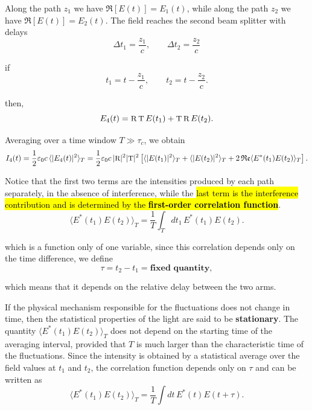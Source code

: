 Along the path $z_1$ we have $\Re[E(t)] = E_1(t)$, while along the path $z_2$ we have $\Re[E(t)] = E_2(t)$. The field reaches the second beam splitter with delays
\begin{equation}\label{eqn:6-delays}
    \Delta t_1 = \frac{z_1}{c}, \qquad \Delta t_2 = \frac{z_2}{c}
\end{equation}

if 
\[
t_1 = t - \frac{z_1}{c}, \qquad t_2 = t - \frac{z_2}{c}.
\]

then,
\begin{equation}\label{eqn:6-field-at-detector}
E_4(t) = \textsc{\small{R}}\, \textsc{\small{T}}\, E(t_1) + \textsc{\small{T}}\, \textsc{\small{R}}\, E(t_2).
\end{equation}

Averaging over a time window $T \gg \tau_c$, we obtain
\begin{equation}\label{eqn:6-intensity-at-detector}
I_4(t) = \frac{1}{2}\varepsilon_0 c\, \langle|E_4(t)|^2\rangle_T
= \frac{1}{2}\varepsilon_0 c\, |\textsc{\small{R}}|^2|\textsc{\small{T}}|^2
\left[
    \langle |E(t_1)|^2\rangle_T + \langle |E(t_2)|^2\rangle_T + 
    2\,\mathfrak{Re} \langle E^*(t_1)E(t_2)\rangle_T
\right].
\end{equation}

Notice that the first two terms are the intensities produced by each path separately, in the absence of interference, while the \hl{last term is the interference contribution and is determined by the \textbf{first-order correlation function}}.
\begin{equation}\label{eqn:6-first-order-correlation-function}
\langle E^*(t_1)E(t_2)\rangle_T = \frac{1}{T}\int_T dt_1\,E^*(t_1)E(t_2).
\end{equation}

which is a function only of one variable, since this correlation depends only on the time difference, we define
\[
\tau = t_2 - t_1 = \textbf{fixed quantity},
\]

which means that it depends on the relative delay between the two arms.

If the physical mechanism responsible for the fluctuations does not change in time, then the statistical properties of the light are said to be \textbf{stationary}.
The quantity $\langle E^*(t_1)E(t_2)\rangle_T$ does not depend on the starting time of the averaging interval, provided that $T$ is much larger than the characteristic time of the fluctuations. Since the intensity is obtained by a statistical average over the field values at $t_1$ and $t_2$, the correlation function depends only on $\tau$ and can be written as
\[
\langle E^*(t_1)E(t_2)\rangle_T = \frac{1}{T}\int dt\,E^*(t)E(t+\tau).
\]

